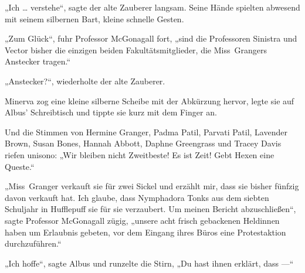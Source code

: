 „Ich … verstehe“, sagte der alte Zauberer langsam. Seine Hände spielten abwesend mit seinem silbernen Bart, kleine schnelle Gesten.

„Zum Glück“, fuhr Professor McGonagall fort, „sind die Professoren Sinistra und Vector bisher die einzigen beiden Fakultätsmitglieder, die Miss~Grangers Anstecker tragen.“

„Anstecker?“, wiederholte der alte Zauberer.

Minerva zog eine kleine silberne Scheibe mit der Abkürzung \SPHEW hervor, legte sie auf Albus’ Schreibtisch und tippte sie kurz mit dem Finger an.

Und die Stimmen von Hermine Granger, Padma Patil, Parvati Patil, Lavender Brown, Susan Bones, Hannah Abbott, Daphne Greengrass und Tracey Davis riefen unisono:
„Wir bleiben nicht Zweitbeste! Es ist Zeit! Gebt Hexen eine Queste.“

„Miss~Granger verkauft sie für zwei Sickel und erzählt mir, dass sie bisher fünfzig davon verkauft hat. Ich glaube, dass Nymphadora Tonks aus dem siebten Schuljahr in Hufflepuff sie für sie verzaubert. Um meinen Bericht abzuschließen“, sagte Professor McGonagall zügig, „unsere acht frisch gebackenen Heldinnen haben um Erlaubnis gebeten, vor dem Eingang ihres Büros eine Protestaktion durchzuführen.“

„Ich hoffe“, sagte Albus und runzelte die Stirn,
„Du hast ihnen erklärt, dass —“

